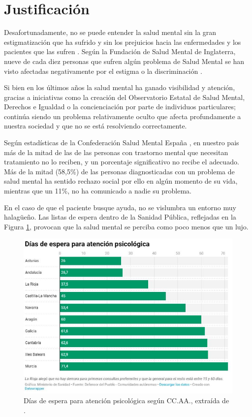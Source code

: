 \section{Justificación}
    
    Desafortunadamente, no se puede entender la salud mental sin la gran estigmatización que ha sufrido y sin los prejuicios hacia las enfermedades y los pacientes que las sufren \cite{delgado_rompiendo_2021} \cite{andres_tallarda_combatir_2020}. Según la Fundación de Salud Mental de Inglaterra, nueve de cada diez personas que sufren algún problema de Salud Mental se han visto afectadas negativamente por el estigma o la discriminación \cite{mental_health_foundation_stigma_nodate}.

    Si bien en los últimos años la salud mental ha ganado visibilidad y atención, gracias a iniciativas como la creación del Observatorio Estatal de Salud Mental, Derechos e Igualdad \cite{confederacion_salud_mental_espana_nace_2022} o la concienciación por parte de individuos particulares; continúa siendo un problema relativamente oculto que afecta profundamente a nuestra sociedad y que no se está resolviendo correctamente. 
    
    Según estadísticas de la Confederación Salud Mental España \cite{confederacion_salud_mental_espana_salud_nodate} \cite{aguilar_laura_2022}, en nuestro pais más de la mitad de las de las personas con trastorno mental que necesitan tratamiento no lo reciben, y un porcentaje significativo no recibe el adecuado. Más de la mitad (58,5\%) de las personas diagnosticadas con un problema de salud mental ha sentido rechazo social por ello en algún momento de su vida, mientras que un 11\%, no ha comunicado a nadie su problema.
    
    En el caso de que el paciente busque ayuda, no se vislumbra un entorno muy halagüeño. Las listas de espera dentro de la Sanidad Pública, reflejadas en la Figura \ref{fig:intro:dias_espera}, provocan que la salud mental se perciba como poco menos que un lujo. 

    \begin{figure}[h]
        \centering
        \includegraphics[width=0.75\linewidth]{figures/dias espera.JPG}
        \caption[Días de espera para atención psicológica según CC.AA.]{Días de espera para atención psicológica según CC.AA., extraída de \cite{asuar_gallego_recurrir_2021}.}
        \label{fig:intro:dias_espera}
    \end{figure}
    
